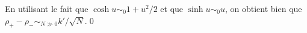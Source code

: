 En utilisant le fait que $\cosh u \sim_0 1 + u^2/2$ et que $\sinh u \sim_0 u$, on obtient bien que $\rho_{+} - \rho_{-} \sim_{N\gg 0} k' / \sqrt{N}$.\qed







%
%
%
%



%

